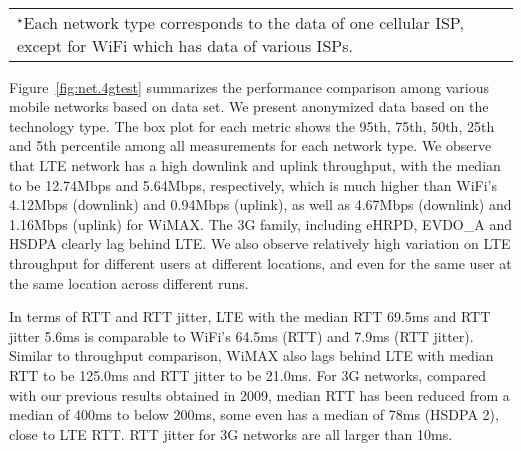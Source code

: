 \begin{figure*}[t]
\centering
{} \\
\label{fig:net.4gtest}
\begin{tabular}{l}
\\{\footnotesize $^\star$Each network type corresponds to the data of one cellular ISP, except for WiFi which has data of various ISPs.}
\end{tabular}
\end{figure*}


Figure~\ref{fig:net.4gtest} summarizes the performance comparison among various mobile networks based on \FT data set. We present anonymized data based on the technology type. The box plot for each metric shows the 95th, 75th, 50th, 25th and 5th percentile among all measurements for each network type. We observe that LTE network has a high downlink and uplink throughput, with the median to be 12.74Mbps and 5.64Mbps, respectively, which is much higher than WiFi's 4.12Mbps (downlink) and 0.94Mbps (uplink), as well as 4.67Mbps (downlink) and 1.16Mbps (uplink) for WiMAX. The 3G family, including eHRPD, EVDO\_A and HSDPA clearly lag behind LTE. We also observe relatively high variation on LTE throughput for different users at different locations, and even for the same user at the same location across different runs. 


In terms of RTT and RTT jitter, LTE with the median RTT 69.5ms and RTT jitter 5.6ms is comparable to WiFi's 64.5ms (RTT) and 7.9ms (RTT jitter). Similar to throughput comparison, WiMAX also lags behind LTE with median RTT to be 125.0ms and RTT jitter to be 21.0ms. For 3G networks, compared with our previous results obtained in 2009, median RTT has been reduced from a median of 400ms to below 200ms, some even has a median of 78ms (HSDPA 2), close to LTE RTT. RTT jitter for 3G networks are all larger than 10ms.


